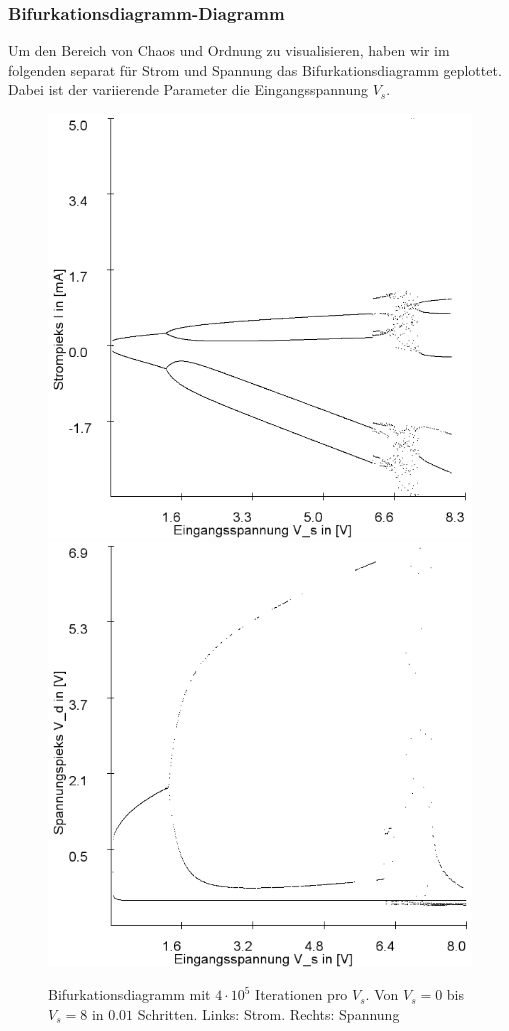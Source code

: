 \documentclass{scrartcl}
\begin{document}
\subsubsection{Bifurkationsdiagramm-Diagramm}
Um den Bereich von Chaos und Ordnung zu visualisieren, haben wir im folgenden separat für Strom und Spannung das Bifurkationsdiagramm geplottet. Dabei ist der variierende Parameter die Eingangsspannung $V_s$.
\begin{figure}[!htbp]
\includegraphics[scale=0.4]{schwing-bifurc-von-0-8-in-0,01schritten-400k-strom}
\includegraphics[scale=0.4]{schwing-bifurc-von-0-8-in-0,01schritten-400k-spannung}
\caption{Bifurkationsdiagramm mit $4\cdot10^5$ Iterationen pro $V_s$. Von $V_s=0$ bis $V_s=8$ in $0.01$ Schritten. Links: Strom. Rechts: Spannung}
\label{fig:ldr-bifurc}
\end{figure}
\end{document}
